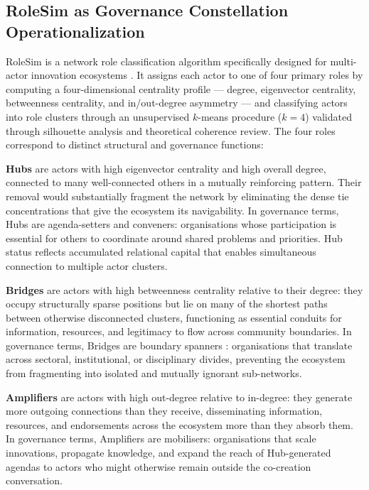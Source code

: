 \documentclass[review,12pt]{elsarticle}
\begin{document}
\subsection{RoleSim as Governance Constellation Operationalization}

RoleSim is a network role classification algorithm specifically designed for multi-actor innovation ecosystems \citep{owoyele2024rolesim}. It assigns each actor to one of four primary roles by computing a four-dimensional centrality profile --- degree, eigenvector centrality, betweenness centrality, and in/out-degree asymmetry --- and classifying actors into role clusters through an unsupervised $k$-means procedure ($k = 4$) validated through silhouette analysis and theoretical coherence review. The four roles correspond to distinct structural and governance functions:

\textbf{Hubs} are actors with high eigenvector centrality and high overall degree, connected to many well-connected others in a mutually reinforcing pattern. Their removal would substantially fragment the network by eliminating the dense tie concentrations that give the ecosystem its navigability. In governance terms, Hubs are agenda-setters and conveners: organisations whose participation is essential for others to coordinate around shared problems and priorities. Hub status reflects accumulated relational capital that enables simultaneous connection to multiple actor clusters.

\textbf{Bridges} are actors with high betweenness centrality relative to their degree: they occupy structurally sparse positions but lie on many of the shortest paths between otherwise disconnected clusters, functioning as essential conduits for information, resources, and legitimacy to flow across community boundaries. In governance terms, Bridges are boundary spanners \citep{howells2006intermediation}: organisations that translate across sectoral, institutional, or disciplinary divides, preventing the ecosystem from fragmenting into isolated and mutually ignorant sub-networks.

\textbf{Amplifiers} are actors with high out-degree relative to in-degree: they generate more outgoing connections than they receive, disseminating information, resources, and endorsements across the ecosystem more than they absorb them. In governance terms, Amplifiers are mobilisers: organisations that scale innovations, propagate knowledge, and expand the reach of Hub-generated agendas to actors who might otherwise remain outside the co-creation conversation.
\end{document}
